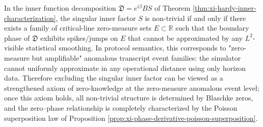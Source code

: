 \begin{remark}\label{rem:xi-singular-inner-factor-information-spikes}
In the inner function decomposition \(\mathfrak{D}=e^{i\beta}BS\) of Theorem \ref{thm:xi-hardy-inner-characterization},
the singular inner factor \(S\) is non-trivial if and only if there exists a family of critical-line zero-measure sets \(E\subset\mathbb{R}\) such that the boundary phase of \(\mathfrak{D}\) exhibits spikes/jumps on \(E\) that cannot be approximated by any \(L^2\)-visible statistical smoothing.
In protocol semantics, this corresponds to "zero-measure but amplifiable" anomalous transcript event families: the simulator cannot uniformly approximate in any operational distance using only horizon data.
Therefore excluding the singular inner factor can be viewed as a strengthened axiom of zero-knowledge at the zero-measure anomalous event level; once this axiom holds, all non-trivial structure is determined by Blaschke zeros, and the zero--phase relationship is completely characterized by the Poisson superposition law of Proposition \ref{prop:xi-phase-derivative-poisson-superposition}.
\end{remark}

